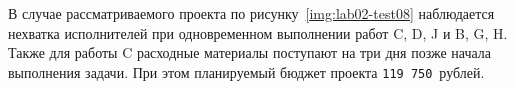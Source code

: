 
В случае рассматриваемого проекта по рисунку~\ref{img:lab02-test08} наблюдается
нехватка исполнителей при одновременном выполнении работ C, D, J и B, G, H.
Также для работы C расходные материалы поступают на три дня позже начала
выполнения задачи. При этом планируемый бюджет проекта \texttt{119 750}~рублей.
